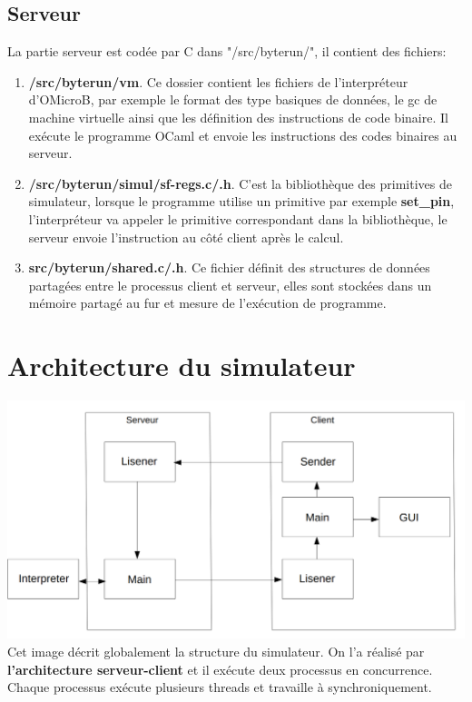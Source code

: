 \documentclass[14px]{article}
\begin{document}
\subsection{Serveur}
La partie serveur est codée par C dans "/src/byterun/", il contient des fichiers:
\begin{enumerate}
\item \textbf{/src/byterun/vm}.
Ce dossier contient les fichiers de l'interpréteur d'OMicroB, par exemple le format des type basiques de données, le gc de machine virtuelle ainsi que les définition des instructions de code binaire. Il exécute le programme OCaml et envoie les instructions des codes binaires au serveur.

\item \textbf{/src/byterun/simul/sf-regs.c/.h}.
C'est la bibliothèque des primitives de simulateur, lorsque le programme utilise un primitive par exemple \textbf{set\_pin}, l'interpréteur va appeler le primitive correspondant dans la bibliothèque, le serveur envoie l'instruction au côté client après le calcul.

\item \textbf{src/byterun/shared.c/.h}.
Ce fichier définit des structures de données partagées
entre le processus client et serveur, elles sont stockées dans un mémoire partagé au fur et mesure de l'exécution de programme.
\end{enumerate}


\clearpage
\pagestyle{fancy}
\rhead{\thepage}
\fancyfoot{}
\section{Architecture du simulateur}
\includegraphics[width=\textwidth]{simulator.png}\\[1cm]
Cet image décrit globalement la structure du simulateur. On l'a réalisé par \textbf{l'architecture serveur-client} et il exécute deux processus en concurrence. Chaque processus exécute plusieurs threads et travaille à synchroniquement.\\
\end{document}
